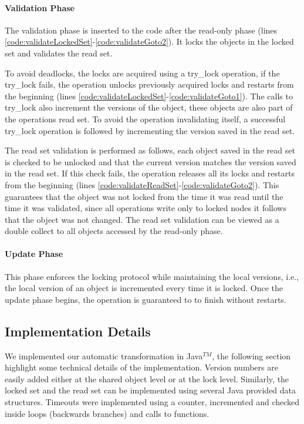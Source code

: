 \paragraph{Validation Phase} 
The validation phase is inserted to the code after
the read-only phase (lines
\ref{code:validateLockedSet}-\ref{code:validateGoto2}). 
It locks the objects in the locked set and validates the read set. 

To avoid deadlocks, the locks are acquired using a try\_lock
operation, if the try\_lock fails, the operation unlocks 
previously acquired locks and restarts from the beginning 
(lines \ref{code:validateLockedSet}-\ref{code:validateGoto1}). 
The calls to try\_lock also increment the versions 
of the object,  these objects are also part of the 
operations read set. 
To avoid the operation invalidating itself, 
a successful try\_lock operation is followed by incrementing
the version saved in the read set.  

The read set validation is performed as follows, 
each object saved in the read set is checked to be unlocked 
and that the current version matches the version saved in the 
read set. If this check fails, the operation releases all its
locks and restarts from the beginning
(lines \ref{code:validateReadSet}-\ref{code:validateGoto2}). 
This guarantees
that the object was not locked from the time it was read until
the time it was validated, since all operations write only to
locked nodes it follows that the object was not changed.  
The read set validation can be viewed as a double collect 
to all objects accessed by the read-only phase. 


  
\paragraph{Update Phase} 
This phase enforces the locking protocol
  while maintaining the local versions, i.e., the local version of 
  an object is incremented every time it is locked.  
  Once the update phase begins, the operation is guaranteed to to 
  finish without restarts.  


\subsection{Implementation Details}
We implemented our automatic transformation in Java$^{TM}$, 
the following section highlight some technical details of 
the implementation.
Version numbers are easily added either at the shared object level
or at the lock level. Similarly, the locked set and the read set 
can be implemented using several Java provided data structures. 
Timeouts were implemented using a counter, incremented and checked
inside loops (backwards branches) and calls to functions.

